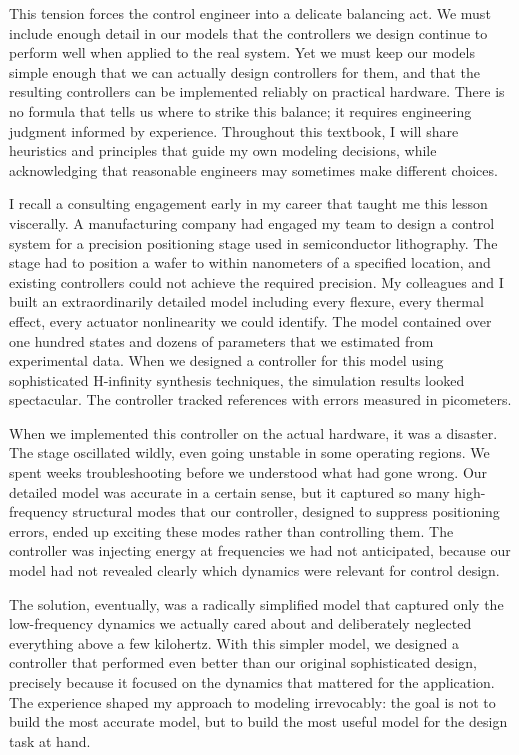 This tension forces the control engineer into a delicate balancing act. We must include enough detail in our models that the controllers we design continue to perform well when applied to the real system. Yet we must keep our models simple enough that we can actually design controllers for them, and that the resulting controllers can be implemented reliably on practical hardware. There is no formula that tells us where to strike this balance; it requires engineering judgment informed by experience. Throughout this textbook, I will share heuristics and principles that guide my own modeling decisions, while acknowledging that reasonable engineers may sometimes make different choices.

I recall a consulting engagement early in my career that taught me this lesson viscerally. A manufacturing company had engaged my team to design a control system for a precision positioning stage used in semiconductor lithography. The stage had to position a wafer to within nanometers of a specified location, and existing controllers could not achieve the required precision. My colleagues and I built an extraordinarily detailed model including every flexure, every thermal effect, every actuator nonlinearity we could identify. The model contained over one hundred states and dozens of parameters that we estimated from experimental data. When we designed a controller for this model using sophisticated H-infinity synthesis techniques, the simulation results looked spectacular. The controller tracked references with errors measured in picometers.

When we implemented this controller on the actual hardware, it was a disaster. The stage oscillated wildly, even going unstable in some operating regions. We spent weeks troubleshooting before we understood what had gone wrong. Our detailed model was accurate in a certain sense, but it captured so many high-frequency structural modes that our controller, designed to suppress positioning errors, ended up exciting these modes rather than controlling them. The controller was injecting energy at frequencies we had not anticipated, because our model had not revealed clearly which dynamics were relevant for control design.

The solution, eventually, was a radically simplified model that captured only the low-frequency dynamics we actually cared about and deliberately neglected everything above a few kilohertz. With this simpler model, we designed a controller that performed even better than our original sophisticated design, precisely because it focused on the dynamics that mattered for the application. The experience shaped my approach to modeling irrevocably: the goal is not to build the most accurate model, but to build the most useful model for the design task at hand.

